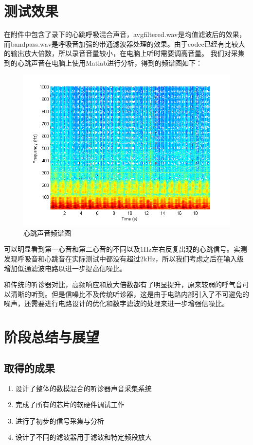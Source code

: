 \documentclass[16pt,a4paper]{article}
\begin{document}
\section{测试效果}
在附件中包含了录下的心跳呼吸混合声音，avgfiltered.wav是均值滤波后的效果，而bandpass.wav是呼吸音加强的带通滤波器处理的效果。由于codec已经有比较大的输出放大倍数，所以录音音量较小，在电脑上听时需要调高音量。
我们对采集到的心跳声音在电脑上使用Matlab进行分析，得到的频谱图如下：

\begin{figure}[H]
\centering
\includegraphics[scale = 0.7]{spectrogram.png}
\caption{心跳声音频谱图} 
\end{figure}
可以明显看到第一心音和第二心音的不同以及1Hz左右反复出现的心跳信号。实测发现呼吸音和心跳音在实际测试中都没有超过2kHz，所以我们考虑之后在输入级增加低通滤波电路以进一步提高信噪比。


和传统的听诊器对比，高频响应和放大倍数都有了明显提升，原来较弱的呼气音可以清晰的听到。但是信噪比不及传统听诊器，这是由于电路内部引入了不可避免的噪声，还需要进行电路设计的优化和数字滤波的处理来进一步增强信噪比。

\section{阶段总结与展望}
\subsection{取得的成果}
\begin{enumerate}
\item 设计了整体的数模混合的听诊器声音采集系统
\item 完成了所有的芯片的软硬件调试工作
\item 进行了初步的信号采集与分析
\item 设计了不同的滤波器用于滤波和特定频段放大
\end{enumerate}
\end{document}
